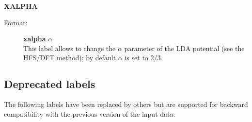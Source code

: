 \documentclass[12pt,a4paper]{article}
\begin{document}
\begin{description}
\begin{description}
\end{description}

\item \textbf{XALPHA}
\begin{description}
\item[Format:] \textbf{xalpha} $\alpha$ \\ This label allows to change the $\alpha$
  parameter of the LDA potential (see the HFS/DFT method); by default $\alpha$ is set
  to 2/3.
\end{description}

\end{description}


\subsection{Deprecated labels}

The following labels have been replaced by others but are supported for backward
compatibility with the previous version of the input data:
\end{document}
